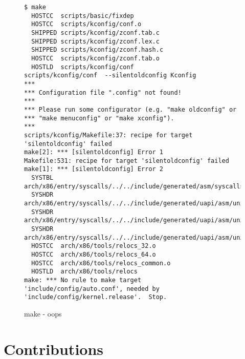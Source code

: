 \documentclass[a4paper]{article}
\begin{document}
\begin{figure}
\begin{verbatim}
$ make
  HOSTCC  scripts/basic/fixdep
  HOSTCC  scripts/kconfig/conf.o
  SHIPPED scripts/kconfig/zconf.tab.c
  SHIPPED scripts/kconfig/zconf.lex.c
  SHIPPED scripts/kconfig/zconf.hash.c
  HOSTCC  scripts/kconfig/zconf.tab.o
  HOSTLD  scripts/kconfig/conf
scripts/kconfig/conf  --silentoldconfig Kconfig
***
*** Configuration file ".config" not found!
***
*** Please run some configurator (e.g. "make oldconfig" or
*** "make menuconfig" or "make xconfig").
***
scripts/kconfig/Makefile:37: recipe for target 'silentoldconfig' failed
make[2]: *** [silentoldconfig] Error 1
Makefile:531: recipe for target 'silentoldconfig' failed
make[1]: *** [silentoldconfig] Error 2
  SYSTBL  arch/x86/entry/syscalls/../../include/generated/asm/syscalls_32.h
  SYSHDR  arch/x86/entry/syscalls/../../include/generated/uapi/asm/unistd_32.h
  SYSHDR  arch/x86/entry/syscalls/../../include/generated/uapi/asm/unistd_64.h
  SYSHDR  arch/x86/entry/syscalls/../../include/generated/uapi/asm/unistd_x32.h
  HOSTCC  arch/x86/tools/relocs_32.o
  HOSTCC  arch/x86/tools/relocs_64.o
  HOSTCC  arch/x86/tools/relocs_common.o
  HOSTLD  arch/x86/tools/relocs
make: *** No rule to make target 'include/config/auto.conf', needed by 'include/config/kernel.release'.  Stop.
\end{verbatim}
\caption{make - oops}
\end{figure}

\clearpage
\appendix

\section{Contributions}

\clearpage
\listoffigures

\clearpage
\listoftables
\end{document}
